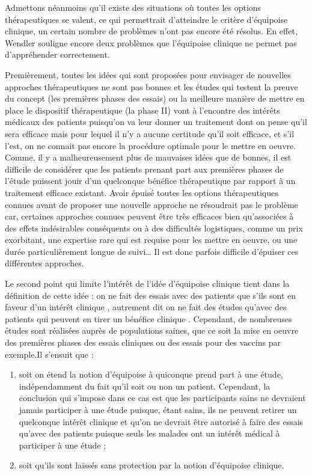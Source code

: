 \documentclass[
  12pt,
]{book}
\begin{document}
Admettons néanmoins qu'il existe des situations où toutes les options thérapeutiques se valent, ce qui permettrait d'atteindre le critère d'équipoise clinique, un certain nombre de problèmes n'ont pas encore été résolus. En effet, Wendler \citeyearpar{sep-clinical-research} souligne encore deux problèmes que l'équipoise clinique ne permet pas d'appréhender correctement.

Premièrement, toutes les idées qui sont proposées pour envisager de nouvelles approches thérapeutiques ne sont pas bonnes et les études qui testent la preuve du concept (les premières phases des essais) ou la meilleure manière de mettre en place le dispositif thérapeutique (la phase II) vont à l'encontre des intérêts médicaux des patients puisqu'on va leur donner un traitement dont on pense qu'il sera efficace mais pour lequel il n'y a aucune certitude qu'il soit efficace, et s'il l'est, on ne connait pas encore la procédure optimale pour le mettre en oeuvre. Comme, il y a malheureusement plus de mauvaises idées que de bonnes, il est difficile de considérer que les patients prenant part aux premières phases de l'étude puissent jouir d'un quelconque bénéfice thérapeutique par rapport à un traitement efficace existant.
Avoir épuisé toutes les options thérapeutiques connues avant de proposer une nouvelle approche ne résoudrait pas le problème car, certaines approches connues peuvent être très efficaces bien qu'associées à des effets indésirables conséquents ou à des difficultés logistiques, comme un prix exorbitant, une expertise rare qui est requise pour les mettre en oeuvre, ou une durée particulièrement longue de suivi\ldots{} Il est donc parfois difficile d'épuiser ces différentes approches.

Le second point qui limite l'intérêt de l'idée d'équipoise clinique tient dans la définition de cette idée : on ne fait des essais avec des patients que s'ils sont en faveur d'un intérêt clinique , autrement dit on ne fait des études qu'avec des patients qui peuvent en tirer un bénéfice clinique \citep{sep-clinical-research}. Cependant, de nombreuses études sont réalisées auprès de populations saines, que ce soit la mise en oeuvre des premières phases des essais cliniques ou des essais pour des vaccins par exemple.Il s'ensuit que :

\begin{enumerate}
\def\labelenumi{\arabic{enumi})}
\item
  soit on étend la notion d'équipoise à quiconque prend part à une étude, indépendamment du fait qu'il soit ou non un patient. Cependant, la conclusion qui s'impose dans ce cas est que les participants sains ne devraient jamais participer à une étude puisque, étant sains, ils ne peuvent retirer un quelconque intérêt clinique et qu'on ne devrait être autorisé à faire des essais qu'avec des patients puisque seuls les malades ont un intérêt médical à participer à une étude ;
\item
  soit qu'ils sont laissés sans protection par la notion d'équipoise clinique.
\end{enumerate}
\end{document}
